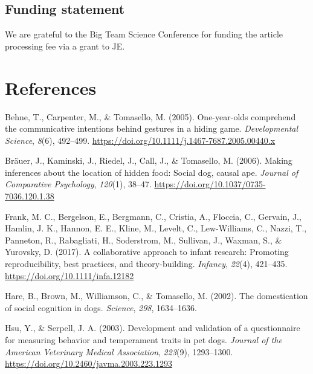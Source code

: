 \documentclass[
  pub,floatsintext]{apa6}
\newlength{\cslhangindent}
\newlength{\cslentryspacingunit} %
\newenvironment{CSLReferences}[2] %
 {%
  \setlength{\parindent}{0pt}
  \ifodd #1
  \let\oldpar\par
  \def\par{\hangindent=\cslhangindent\oldpar}
  \fi
  \setlength{\parskip}{#2\cslentryspacingunit}
 }%
 {}
\begin{document}
\hypertarget{funding-statement}{%
\subsection{Funding statement}\label{funding-statement}}

We are grateful to the Big Team Science Conference for funding the article processing fee via a grant to JE.

\newpage

\hypertarget{references}{%
\section{References}\label{references}}

\scriptsize

\hypertarget{refs}{}
\begin{CSLReferences}{1}{0}
\leavevmode{}%
Behne, T., Carpenter, M., \& Tomasello, M. (2005). One-year-olds comprehend the communicative intentions behind gestures in a hiding game. \emph{Developmental Science}, \emph{8}(6), 492--499. \url{https://doi.org/10.1111/j.1467-7687.2005.00440.x}

\leavevmode{}%
Bräuer, J., Kaminski, J., Riedel, J., Call, J., \& Tomasello, M. (2006). Making inferences about the location of hidden food: {Social} dog, causal ape. \emph{Journal of Comparative Psychology}, \emph{120}(1), 38--47. \url{https://doi.org/10.1037/0735-7036.120.1.38}

\leavevmode{}%
Frank, M. C., Bergelson, E., Bergmann, C., Cristia, A., Floccia, C., Gervain, J., Hamlin, J. K., Hannon, E. E., Kline, M., Levelt, C., Lew-Williams, C., Nazzi, T., Panneton, R., Rabagliati, H., Soderstrom, M., Sullivan, J., Waxman, S., \& Yurovsky, D. (2017). A collaborative approach to infant research: Promoting reproducibility, best practices, and theory-building. \emph{Infancy}, \emph{22}(4), 421--435. \url{https://doi.org/10.1111/infa.12182}

\leavevmode{}%
Hare, B., Brown, M., Williamson, C., \& Tomasello, M. (2002). The domestication of social cognition in dogs. \emph{Science}, \emph{298}, 1634--1636.

\leavevmode{}%
Hsu, Y., \& Serpell, J. A. (2003). Development and validation of a questionnaire for measuring behavior and temperament traits in pet dogs. \emph{Journal of the American Veterinary Medical Association}, \emph{223}(9), 1293--1300. \url{https://doi.org/10.2460/javma.2003.223.1293}


\end{CSLReferences}
\end{document}
